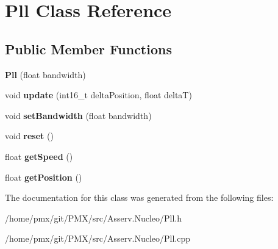 \hypertarget{classPll}{}\section{Pll Class Reference}
\label{classPll}
\subsection*{Public Member Functions}
\begin{DoxyCompactItemize}
\item 
\mbox{\label{classPll_a909384852b0bbff443330ebce4a62a6e}} 
{\bfseries Pll} (float bandwidth)
\item 
\mbox{\label{classPll_a3d5ba8a4f5fd98e3d96936d3bf539bcf}} 
void {\bfseries update} (int16\+\_\+t delta\+Position, float deltaT)
\item 
\mbox{\label{classPll_a78038cf067703e1dfe4b634536806609}} 
void {\bfseries set\+Bandwidth} (float bandwidth)
\item 
\mbox{\label{classPll_a277363ac926c80138f3e4adc46705587}} 
void {\bfseries reset} ()
\item 
\mbox{\label{classPll_a4ca8bf3ea3a857b2536c6060d04718a7}} 
float {\bfseries get\+Speed} ()
\item 
\mbox{\label{classPll_a8a7df160e9c97072125a4513d56bc7df}} 
float {\bfseries get\+Position} ()
\end{DoxyCompactItemize}


The documentation for this class was generated from the following files\+:\begin{DoxyCompactItemize}
\item 
/home/pmx/git/\+P\+M\+X/src/\+Asserv.\+Nucleo/Pll.\+h\item 
/home/pmx/git/\+P\+M\+X/src/\+Asserv.\+Nucleo/Pll.\+cpp\end{DoxyCompactItemize}
